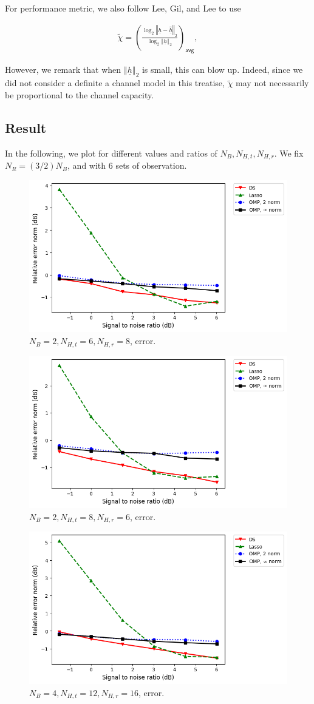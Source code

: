 \documentclass[journal]{IEEEtran}
\newcommand {\m} [1] {\( #1 \)}
\newcommand {\V} [1] {\underline {#1}}
\newcommand {\T} [1] {\tilde {#1}}
\newcommand {\RB} [1] {\left( #1 \right)}
\newcommand {\VNm} [1] {\left \Vert #1 \right \Vert}
\newcommand {\Disp} [1] {
   \begin {align*}
      #1
   \end {align*}
}
\begin{document}
{For performance metric, we also follow Lee, Gil, and Lee \cite {LGL16} to use
\Disp {
\tilde {\chi}
=\RB {
   \frac {\log_2 {\VNm {\V {h} -\hat {\V {h}}} _2}}
   {\log_2 {\VNm {\V {h}}_2}}
} _{\mathsf {avg}}, 
}
However, we remark that when \m {\VNm {\V {h}}_2} is small, this can blow up.
Indeed, since we did not consider a definite a channel model in this treatise, \m {\T {\chi}} may not necessarily be proportional to the channel capacity.

\subsection {Result}

In the following, we plot for different values and ratios of \m {N_B, N_{H,t}, N_{H,r}}.
We fix \m {N_R = \RB {3/2} N_B}, and with \m {6} sets of observation.

\begin {figure} [H]
\includegraphics [width = 0.45 \textwidth]
{error-small-more-tall-six-usual.png}
\caption {\m {N_B = 2, N_{H,t} = 6, N_{H,r} = 8}, error.}
\end {figure}

\begin {figure} [H]
\includegraphics [width = 0.45 \textwidth]
{error-small-more-wide-six-usual.png}
\caption {\m {N_B = 2, N_{H,t} = 8, N_{H,r} = 6}, error.}
\end {figure}

\begin {figure} [H]
\includegraphics [width = 0.45 \textwidth]
{error-medium-more-tall-six-usual.png}
\caption {\m {N_B = 4, N_{H,t} = 12, N_{H,r} = 16}, error.}
\end {figure}

}
\end{document}
